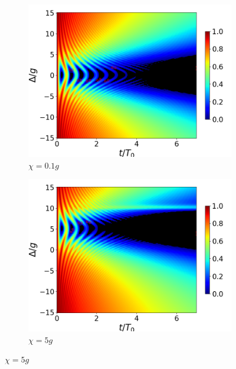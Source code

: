 \begin{figure}[h!]
\begin{subfigure}{0.49\textwidth}
        \caption{}
        \label{fig4:concu detunning 0 dis}
    \end{subfigure}
    \vfill
        \begin{subfigure}{0.49\textwidth}
        \includegraphics[width=\textwidth]{figuras/ch4/concu/delta/eg0+ge0 k=0.0g x=0.1g J=0.0g gamma=0.25g concu delta dis.png}
        \caption{$\chi=0.1g$}
        \label{fig4:concu detunning x1}
    \end{subfigure}
    \hfill
    \begin{subfigure}{0.49\textwidth}
        \includegraphics[width=\textwidth]{figuras/ch4/concu/delta/eg0+ge0 k=0.0g x=5.0g J=0.0g gamma=0.25g concu delta dis.png}
        \caption{$\chi=5g$}
        \label{fig4:concu detunning x2}

\end{subfigure}
\end{figure}
